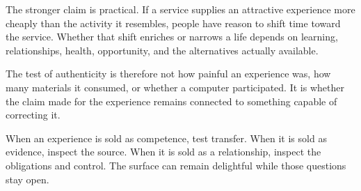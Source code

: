 The stronger claim is practical. If a service supplies an attractive experience more cheaply than the activity it resembles, people have reason to shift time toward the service. Whether that shift enriches or narrows a life depends on learning, relationships, health, opportunity, and the alternatives actually available.

The test of authenticity is therefore not how painful an experience was, how many materials it consumed, or whether a computer participated. It is whether the claim made for the experience remains connected to something capable of correcting it.

When an experience is sold as competence, test transfer. When it is sold as evidence, inspect the source. When it is sold as a relationship, inspect the obligations and control. The surface can remain delightful while those questions stay open.
